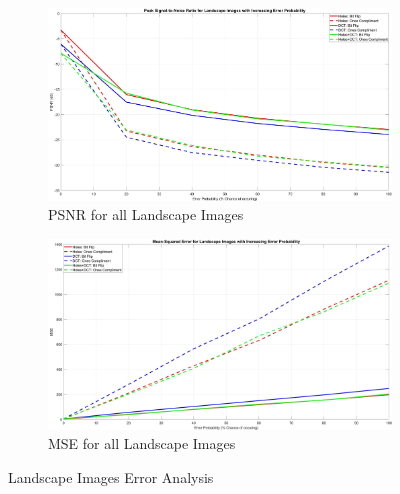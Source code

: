 \documentclass[landscape,a0paper,fontscale=0.5]{baposter} %
\begin{document}
\begin{poster}
{\vspace{-1em}
\begin{figure}[H]
\centering
	\begin{subfigure}{0.4\textwidth} %
		\includegraphics[scale=0.09]{PSNRLandscape}
		\caption{PSNR for all Landscape Images} %
	\end{subfigure}
	\vspace{1em} %
	\begin{subfigure}{0.4\textwidth} %
		\includegraphics[scale=0.09]{MSELandscape}
		\caption{MSE for all Landscape Images} %
	\end{subfigure}
	\vspace{-2em}
	\caption{Landscape Images Error Analysis}
	\label{fig: Landscape Error} %
\end{figure}

}
\end{poster}
\end{document}
